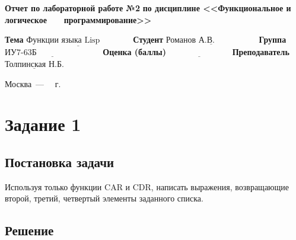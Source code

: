 \documentclass[12pt]{report}
\begin{document}
\begin{titlepage}
		\begin{center}
			\noindent\begin{minipage}{1.1\textwidth}\centering
				\Large\textbf{  Отчет по лабораторной работе №2}\newline
				\textbf{по дисциплине <<Функциональное и логическое}\newline
				\textbf{~~~программирование>>}\newline\newline
			\end{minipage}
		\end{center}
		
		\noindent\textbf{Тема} $\underline{\text{Функции языка Lisp~~~~~~~~~~~}}$\newline\newline
		\noindent\textbf{Студент} $\underline{\text{Романов А.В.~~~~~~~~~~~~~~~}}$\newline\newline
		\noindent\textbf{Группа} $\underline{\text{ИУ7-63Б~~~~~~~~~~~~~~~~~~~~~~~}}$\newline\newline
		\noindent\textbf{Оценка (баллы)} $\underline{\text{~~~~~~~~~~~~~~~~~~~~~~}}$\newline\newline
		\noindent\textbf{Преподаватель} $\underline{\text{Толпинская Н.Б.}}$\newline\newline\newline
		
		\begin{center}
			\vfill
			Москва~---~\the\year
			~г.
		\end{center}
	\end{titlepage}
	
	
	
\section*{Задание 1}
\subsection*{Постановка задачи}
	
Используя только функции CAR и CDR, написать
выражения, возвращающие второй, третий, четвертый элементы заданного
списка.
	
\subsection*{Решение}
\end{document}
